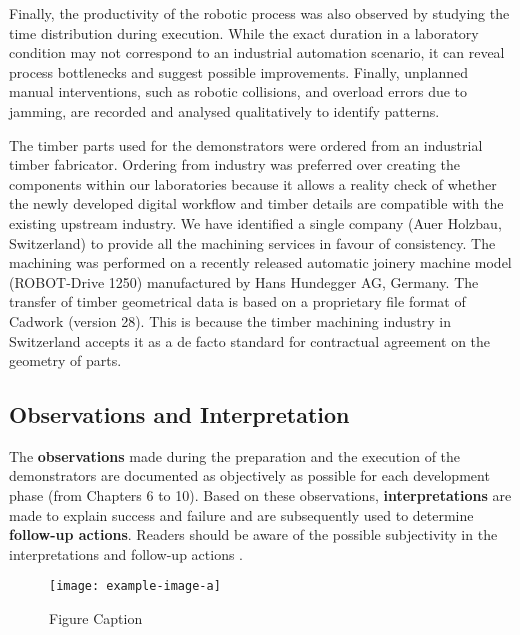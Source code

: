 Finally, the productivity of the robotic process was also observed by studying the time distribution during execution. While the exact duration in a laboratory condition may not correspond to an industrial automation scenario, it can reveal process bottlenecks and suggest possible improvements. Finally, unplanned manual interventions, such as robotic collisions, and overload errors due to jamming, are recorded and analysed qualitatively to identify patterns.

The timber parts used for the demonstrators were ordered from an industrial timber fabricator. Ordering from industry was preferred over creating the components within our laboratories because it allows a reality check of whether the newly developed digital workflow and timber details are compatible with the existing upstream industry. We have identified a single company (Auer Holzbau, Switzerland) to provide all the machining services in favour of consistency. The machining was performed on a recently released automatic joinery machine model (ROBOT-Drive 1250) manufactured by Hans Hundegger AG, Germany. The transfer of timber geometrical data is based on a proprietary file format of Cadwork (version 28). This is because the timber machining industry in Switzerland accepts it as a de facto standard for contractual agreement on the geometry of parts.

\subsection{Observations and Interpretation}
\label{subsection:methodology-observations-and-interpretation}

The \textbf{observations }made during the preparation and the execution of the demonstrators are documented as objectively as possible for each development phase (from Chapters 6 to 10). Based on these observations, \textbf{interpretations }are made to explain success and failure and are subsequently used to determine \textbf{follow-up actions}. Readers should be aware of the possible subjectivity in the interpretations and follow-up actions . 

\begin{figure}
    \centering
    \texttt{[image: example-image-a]}
    \caption{Figure Caption}
\end{figure}

